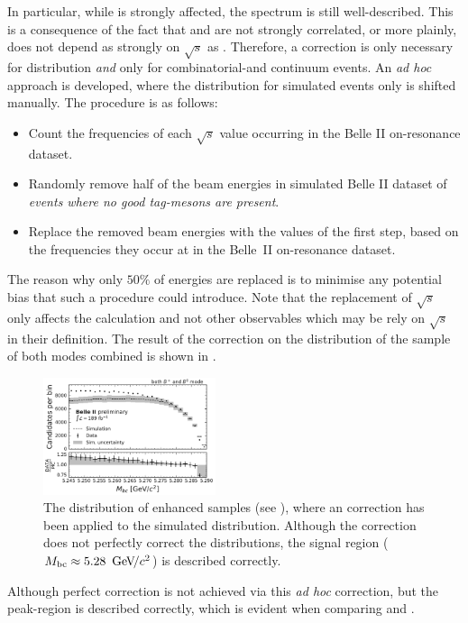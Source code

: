 In particular, while \Mbc is strongly affected, the \EB spectrum is still well-described.
This is a consequence of the fact that \EB and \Mbc are not strongly correlated, or more plainly, \EB does not depend as strongly on $\sqrt{s}$ as \Mbc.
Therefore, a correction is only necessary for \Mbc distribution \textit{and} only for combinatorial-\BB and continuum events.
An \textit{ad hoc} approach is developed, where the \Mbc distribution for simulated events only is shifted manually. 
The procedure is as follows:
\begin{itemize}
    \item Count the frequencies of each $\sqrt{s}$ value occurring in the Belle II on-resonance dataset.
    \item Randomly remove half of the beam energies in simulated Belle II dataset of \textit{events where no good tag-\B mesons are present}.
    \item Replace the removed beam energies with the values of the first step, based on the frequencies they occur at in the Belle~II on-resonance dataset.
\end{itemize}
The reason why only $50\%$ of energies are replaced is to minimise any potential bias that such a procedure could introduce.
Note that the replacement of $\sqrt{s}$ only affects the \Mbc calculation and not other observables which may be rely on $\sqrt{s}$ in their definition.
The result of the correction on the \Mbc distribution of the sample of both \FEI modes combined is shown in .
\begin{figure}[htbp!]
    \centering
    \includegraphics[width=0.45\textwidth]{figures/data_validation/Bboth_qqbar_enhanced_mbccorrected.pdf}
    \caption{\label{fig:qqbar_enhanced_mbccorrected} The \Mbc distribution of \qqbar enhanced samples (see ),
    where an \Mbc correction has been applied to the simulated distribution.
    Although the correction does not perfectly correct the distributions, the signal region (${M_{\mathrm{bc}}}\approx5.28~{\mathrm{\,Ge\kern -0.1em V\!/}c^2}$) is described correctly.}
\end{figure}
Although perfect correction is not achieved via this \textit{ad hoc} correction, but the peak-region is described correctly, which is evident when comparing  and .

